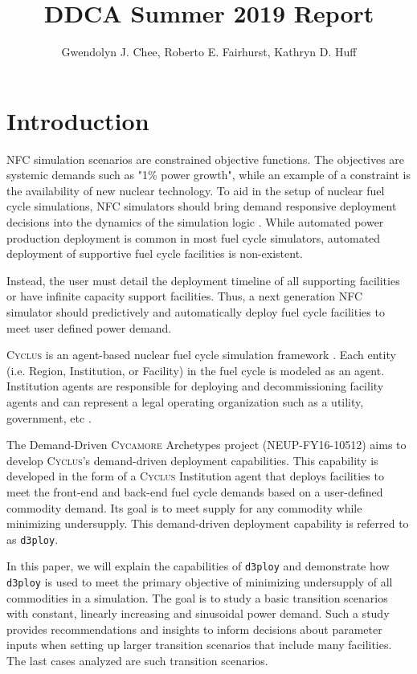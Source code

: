 \documentclass[11pt,letterpaper]{article}
\title{DDCA Summer 2019 Report}
\author{Gwendolyn J. Chee, Roberto E. Fairhurst, Kathryn D. Huff}
\newcommand{\Cyclus}{\textsc{Cyclus}\xspace}%
\newcommand{\Cycamore}{\textsc{Cycamore}\xspace}%
\newcommand{\deploy}{\texttt{d3ploy}\xspace}%
\begin{document}
	\begin{titlepage}
	\maketitle
	\thispagestyle{empty}
	\end{titlepage}

\section{Introduction}
\gls{NFC} simulation scenarios are constrained objective functions. 
The objectives are systemic demands such as "1\% power growth", 
while an example of a constraint is the availability of new nuclear 
technology. 
To aid in the setup of nuclear fuel cycle simulations, \gls{NFC}
simulators should bring demand responsive deployment decisions into 
the dynamics of the simulation logic \cite{huff_current_2017}. 
While automated power production deployment is common in most fuel 
cycle simulators, automated deployment of supportive fuel cycle 
facilities is non-existent. 

Instead, the user must detail the deployment timeline of all 
supporting facilities or have infinite capacity support facilities. 
Thus, a next generation \gls{NFC} simulator should predictively and 
automatically deploy fuel cycle facilities to meet user defined 
power demand. 

\Cyclus is an agent-based nuclear fuel cycle simulation framework 
\cite{huff_fundamental_2016}. 
Each entity (i.e. Region, Institution, or Facility) in the fuel 
cycle is modeled as an agent. 
Institution agents
are responsible for deploying and decommissioning facility agents 
and can represent a legal operating organization such as a 
utility, government, etc \cite{huff_fundamental_2016}. 

The Demand-Driven \Cycamore Archetypes project (NEUP-FY16-10512)
aims to develop \Cyclus's demand-driven deployment capabilities. 
This capability is developed in the form of a \Cyclus Institution
agent that deploys facilities to meet the front-end and back-end 
fuel cycle demands based on a user-defined commodity demand. 
Its goal is to meet supply for any commodity while minimizing 
undersupply.
This demand-driven deployment capability is referred to as 
\deploy. 

In this paper, we will explain the capabilities of \deploy and 
demonstrate how \deploy is used to meet the primary objective
of minimizing undersupply of all commodities in a simulation.
The goal is to study a basic transition scenarios with constant,
linearly increasing and sinusoidal power demand. Such a study
provides recommendations and insights to inform 
decisions about parameter inputs when setting up 
larger transition scenarios that include many facilities.
The last cases analyzed are such transition scenarios.
\end{document}
